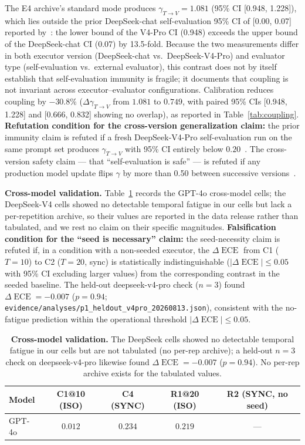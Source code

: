 \documentclass[11pt]{article}
\DeclareMathOperator{\ECE}{ECE}
\begin{document}
The E4 archive's standard mode produces $\gamma_{T \to V} = 1.081$ (95\% CI [0.948, 1.228]), which lies outside the prior DeepSeek-chat self-evaluation 95\% CI of [0.00, 0.07] reported by~\citet{epc2026}: the lower bound of the V4-Pro CI (0.948) exceeds the upper bound of the DeepSeek-chat CI (0.07) by 13.5-fold. Because the two measurements differ in both executor version (DeepSeek-chat vs.\ DeepSeek-V4-Pro) and evaluator type (self-evaluation vs.\ external evaluator), this contrast does not by itself establish that self-evaluation immunity is fragile; it documents that coupling is not invariant across executor--evaluator configurations. Calibration reduces coupling by $-30.8\%$ ($\Delta\gamma_{T\to V}$ from $1.081$ to $0.749$, with paired 95\% CIs [0.948, 1.228] and [0.666, 0.832] showing no overlap), as reported in Table~\ref{tab:coupling}. \textbf{Refutation condition for the cross-version generalization claim:} the prior immunity claim is refuted if a fresh DeepSeek-V4-Pro self-evaluation run on the same prompt set produces $\gamma_{T\to V}$ with 95\% CI entirely below $0.20$~\citep{epc2026,tian2023just}. The cross-version safety claim --- that ``self-evaluation is safe'' --- is refuted if any production model update flips $\gamma$ by more than 0.50 between successive versions~\citep{sclar2024quantifying}.

\textbf{Cross-model validation.} Table~\ref{tab:cross} records the GPT-4o cross-model cells; the DeepSeek-V4 cells showed no detectable temporal fatigue in our cells but lack a per-repetition archive, so their values are reported in the data release rather than tabulated, and we rest no claim on their specific magnitudes. \textbf{Falsification condition for the ``seed is necessary'' claim:} the seed-necessity claim is refuted if, in a condition with a non-seeded executor, the $\Delta\ECE$ from C1 ($T{=}10$) to C2 ($T{=}20$, sync) is statistically indistinguishable ($|\Delta\ECE| \leq 0.05$ with 95\% CI excluding larger values) from the corresponding contrast in the seeded baseline. The held-out deepseek-v4-pro check ($n{=}3$) found $\Delta\ECE = -0.007$ ($p = 0.94$; \texttt{evidence/analyses/p1\_heldout\_v4pro\_20260813.json}), consistent with the no-fatigue prediction within the operational threshold $|\Delta\ECE| \leq 0.05$.

\begin{table}[H]
\centering
\caption{\textbf{Cross-model validation.} The DeepSeek cells showed no detectable temporal fatigue in our cells but are not tabulated (no per-rep archive); a held-out $n{=}3$ check on deepseek-v4-pro likewise found $\Delta\ECE=-0.007$ ($p=0.94$). No per-rep archive exists for the tabulated values.}
\label{tab:cross}
\begin{tabular}{@{}lcccc@{}}
\toprule
Model & C1@10 (ISO) & C4 (SYNC) & R1@20 (ISO) & R2 (SYNC, no seed) \\
\midrule
GPT-4o & $0.012$ & $0.234$ & $0.219$ & --- \\
\bottomrule
\end{tabular}
\end{table}
\end{document}
